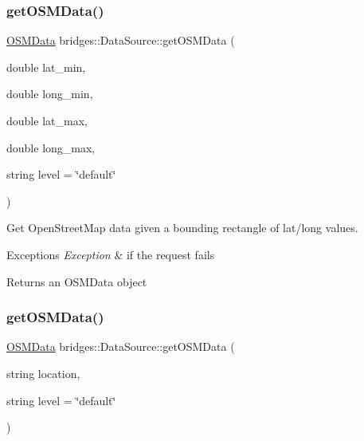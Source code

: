 \subsubsection{\texorpdfstring{get\+O\+S\+M\+Data()}{getOSMData()}\hspace{0.1cm}{\footnotesize\ttfamily [1/2]}}
{\footnotesize\ttfamily \hyperlink{classbridges_1_1dataset_1_1_o_s_m_data}{O\+S\+M\+Data} bridges\+::\+Data\+Source\+::get\+O\+S\+M\+Data (\begin{DoxyParamCaption}\item[{double}]{lat\+\_\+min,  }\item[{double}]{long\+\_\+min,  }\item[{double}]{lat\+\_\+max,  }\item[{double}]{long\+\_\+max,  }\item[{string}]{level = {\ttfamily \char`\"{}default\char`\"{}} }\end{DoxyParamCaption})\hspace{0.3cm}{\ttfamily [inline]}}

Get Open\+Street\+Map data given a bounding rectangle of lat/long values.


\begin{DoxyExceptions}{Exceptions}
{\em Exception} & if the request fails\\
\hline
\end{DoxyExceptions}
\begin{DoxyReturn}{Returns}
an O\+S\+M\+Data object 
\end{DoxyReturn}
\mbox{\label{classbridges_1_1_data_source_a3151f5b2a27b5d6b11e1c5cb55d51655}} 
\subsubsection{\texorpdfstring{get\+O\+S\+M\+Data()}{getOSMData()}\hspace{0.1cm}{\footnotesize\ttfamily [2/2]}}
{\footnotesize\ttfamily \hyperlink{classbridges_1_1dataset_1_1_o_s_m_data}{O\+S\+M\+Data} bridges\+::\+Data\+Source\+::get\+O\+S\+M\+Data (\begin{DoxyParamCaption}\item[{string}]{location,  }\item[{string}]{level = {\ttfamily \char`\"{}default\char`\"{}} }\end{DoxyParamCaption})\hspace{0.3cm}{\ttfamily [inline]}}

